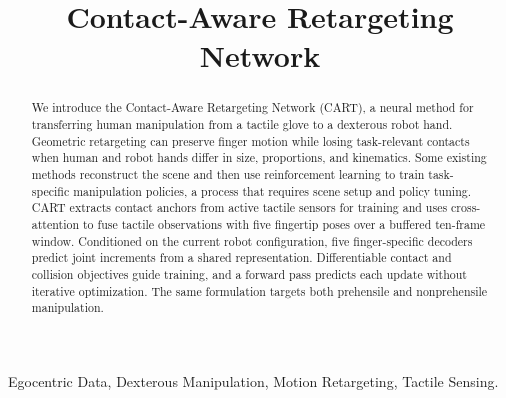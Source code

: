 \documentclass[letterpaper,journal]{IEEEtran}
\begin{document}
\title{Contact-Aware Retargeting Network}
\author{} %

\maketitle

\begin{abstract}
We introduce the Contact-Aware Retargeting Network (CART), a neural method for transferring human manipulation from a tactile glove to a dexterous robot hand. Geometric retargeting can preserve finger motion while losing task-relevant contacts when human and robot hands differ in size, proportions, and kinematics. Some existing methods reconstruct the scene and then use reinforcement learning to train task-specific manipulation policies, a process that requires scene setup and policy tuning. CART extracts contact anchors from active tactile sensors for training and uses cross-attention to fuse tactile observations with five fingertip poses over a buffered ten-frame window. Conditioned on the current robot configuration, five finger-specific decoders predict joint increments from a shared representation. Differentiable contact and collision objectives guide training, and a forward pass predicts each update without iterative optimization. The same formulation targets both prehensile and nonprehensile manipulation.
\end{abstract}

\begin{IEEEkeywords}
Egocentric Data, Dexterous Manipulation, Motion Retargeting, Tactile Sensing.
\end{IEEEkeywords}









\end{document}
